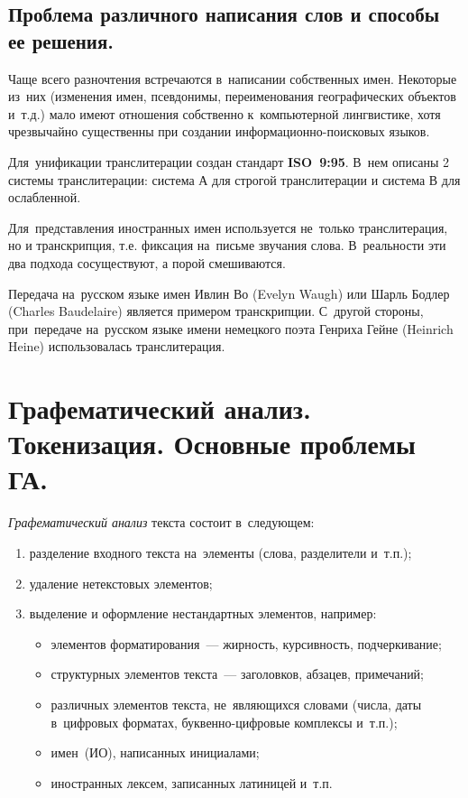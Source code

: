 \documentclass[12pt]{article}
\theoremstyle{definition}
\theoremstyle{remark}
\numberwithin{equation}{section}
\begin{document}
\subsection{Проблема различного написания слов и способы ее решения.}
Чаще всего разночтения встречаются в~написании собственных имен. Некоторые 
из~них (изменения имен, псевдонимы, переименования географических объектов и~т.д.) 
мало имеют отношения собственно к~компьютерной лингвистике, хотя чрезвычайно 
существенны при создании информационно-поисковых языков.

Для~унификации транслитерации создан стандарт \textbf{ISO~9:95}. В~нем 
описаны 2 системы транслитерации: система А для строгой транслитерации 
и система В для ослабленной.

Для~представления иностранных имен используется не~только транслитерация, 
но и транскрипция, т.е. фиксация на~письме звучания слова. В~реальности 
эти два подхода сосуществуют, а порой смешиваются.

Передача на~русском языке имен Ивлин Во (Evelyn Waugh) или Шарль Бодлер 
(Charles Baudelaire) является примером транскрипции. С~другой стороны, 
при~передаче на~русском языке имени немецкого поэта Генриха Гейне (Heinrich 
Heine) использовалась транслитерация.

\section{Графематический анализ. Токенизация. Основные проблемы ГА.}
\textsl{Графематический анализ} текста состоит в~следующем:
\begin{enumerate}
    \item разделение входного текста на~элементы (слова, 
    разделители и~т.п.);
    \item удаление нетекстовых элементов;
    \item выделение и оформление нестандартных элементов, например:
    \begin{itemize}
        \item элементов форматирования~--- жирность, курсивность, 
        подчеркивание;
        \item структурных элементов текста~--- заголовков, абзацев,
        примечаний;
        \item различных элементов текста, не~являющихся словами
        (числа, даты в~цифровых форматах, буквенно-цифровые комплексы
        и~т.п.);
        \item имен~(ИО), написанных инициалами;
        \item иностранных лексем, записанных латиницей и~т.п.
    \end{itemize}
\end{enumerate}
\end{document}
